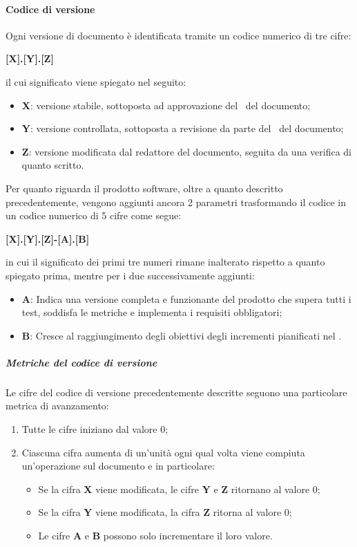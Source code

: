         \paragraph{Codice di versione}
        Ogni versione di documento è identificata tramite un codice numerico di tre cifre:
        \begin{center}
            \Large \textbf{[X].[Y].[Z]}
        \end{center}
        il cui significato viene spiegato nel seguito:
        \begin{itemize}
            \item \textbf{X}: versione stabile, sottoposta ad approvazione del \roleProjectManagerLow\ del documento;
            \item \textbf{Y}: versione controllata, sottoposta a revisione da parte del \roleVerifierLow\ del documento;
            \item \textbf{Z}: versione modificata dal redattore del documento, seguita da una verifica di quanto scritto.
        \end{itemize}
        Per quanto riguarda il prodotto software, oltre a quanto descritto precedentemente, vengono aggiunti ancora 2 parametri trasformando il codice in un codice numerico di 5 cifre come segue:
        \begin{center}
            \Large \textbf{[X].[Y].[Z]-[A].[B]}
        \end{center}
        in cui il significato dei primi tre numeri rimane inalterato rispetto a quanto spiegato prima, mentre per i due successivamente aggiunti:
        \begin{itemize}
            \item \textbf{A}: Indica una versione completa e funzionante del prodotto che supera tutti i test, soddisfa le metriche e implementa i requisiti obbligatori;
            \item \textbf{B}: Cresce al raggiungimento degli obiettivi degli incrementi pianificati nel \docNamePdPLow.
        \end{itemize}

            \subparagraph{Metriche del codice di versione}
            Le cifre del codice di versione precedentemente descritte seguono una particolare metrica di avanzamento:
            \begin{enumerate}
                \item Tutte le cifre iniziano dal valore 0;
                \item Ciascuna cifra aumenta di un'unità ogni qual volta viene compiuta un'operazione sul documento e in particolare:
                \begin{itemize}
                    \item Se la cifra \textbf{X} viene modificata, le cifre \textbf{Y} e \textbf{Z} ritornano al valore 0;
                    \item Se la cifra \textbf{Y} viene modificata, la cifra \textbf{Z} ritorna al valore 0;
                    \item Le cifre \textbf{A} e \textbf{B} possono solo incrementare il loro valore.
                \end{itemize}
            \end{enumerate}

